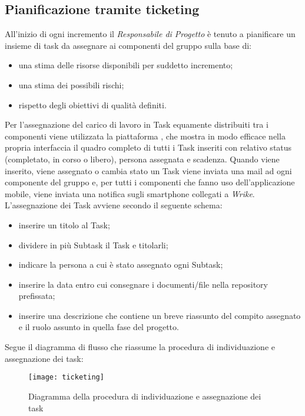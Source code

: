 \documentclass[../NormediProgetto.tex]{subfiles}
\begin{document}
	\subsection{Pianificazione tramite ticketing}
	
	All'inizio di ogni incremento il \textit{Responsabile di Progetto} è tenuto a pianificare un insieme di task da assegnare ai componenti del gruppo sulla base di:
	 
	\begin{itemize}
	 	\item una stima delle risorse disponibili per suddetto incremento;
	 	\item una stima dei possibili rischi;
	 	\item rispetto degli obiettivi di qualità definiti.
	\end{itemize}
	 
	\noindent Per l'assegnazione del carico di lavoro in Task equamente distribuiti tra i componenti viene utilizzata la piattaforma , che mostra in modo efficace nella propria interfaccia il quadro completo di tutti i Task inseriti con relativo status (completato, in corso o libero), persona assegnata e scadenza. Quando viene inserito, viene assegnato o cambia stato un Task viene inviata una mail ad ogni componente del gruppo e, per tutti i componenti che fanno uso dell'applicazione mobile, viene inviata una notifica sugli smartphone collegati a \textit{Wrike}.
	\\ \noindent L'assegnazione dei Task avviene secondo il seguente schema:
	
	\begin{itemize}
		\item inserire un titolo al Task;
		\item dividere in più Subtask il Task e titolarli;
		\item indicare la persona a cui è stato assegnato ogni Subtask;
		\item inserire la data entro cui consegnare i documenti/file nella repository prefissata;
		\item inserire una descrizione che contiene un breve riassunto del compito assegnato e il ruolo assunto in quella fase del progetto.
	\end{itemize}
	
	Segue il diagramma di flusso che riassume la procedura di individuazione e assegnazione dei task:
	
	\begin{figure}[H]
		\texttt{[image: ticketing]}
		\centering
		\caption{Diagramma della procedura di individuazione e assegnazione dei task}
	\end{figure}
	
\end{document}
